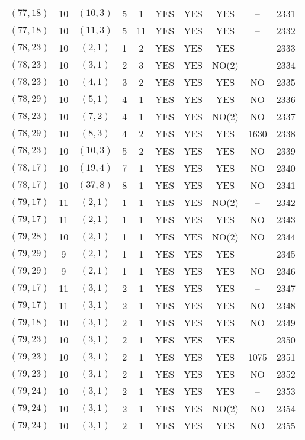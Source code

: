 \begin{longtable}{|c|c|c|c|c|c|c|c|c|c|}
$(77, 18)$ & 10 & $(10, 3)$ & 5 & 1 & YES & YES & YES & -- & 2331\\
$(77, 18)$ & 10 & $(11, 3)$ & 5 & 11 & YES & YES & YES & -- & 2332\\
$(78, 23)$ & 10 & $(2, 1)$ & 1 & 2 & YES & YES & YES & -- & 2333\\
$(78, 23)$ & 10 & $(3, 1)$ & 2 & 3 & YES & YES & NO(2) & -- & 2334\\
$(78, 23)$ & 10 & $(4, 1)$ & 3 & 2 & YES & YES & YES & NO & 2335\\
$(78, 29)$ & 10 & $(5, 1)$ & 4 & 1 & YES & YES & YES & NO & 2336\\
$(78, 23)$ & 10 & $(7, 2)$ & 4 & 1 & YES & YES & NO(2) & NO & 2337\\
$(78, 29)$ & 10 & $(8, 3)$ & 4 & 2 & YES & YES & YES & 1630 & 2338\\
$(78, 23)$ & 10 & $(10, 3)$ & 5 & 2 & YES & YES & YES & NO & 2339\\
$(78, 17)$ & 10 & $(19, 4)$ & 7 & 1 & YES & YES & YES & NO & 2340\\
$(78, 17)$ & 10 & $(37, 8)$ & 8 & 1 & YES & YES & YES & NO & 2341\\
$(79, 17)$ & 11 & $(2, 1)$ & 1 & 1 & YES & YES & NO(2) & -- & 2342\\
$(79, 17)$ & 11 & $(2, 1)$ & 1 & 1 & YES & YES & YES & NO & 2343\\
$(79, 28)$ & 10 & $(2, 1)$ & 1 & 1 & YES & YES & NO(2) & NO & 2344\\
$(79, 29)$ & 9 & $(2, 1)$ & 1 & 1 & YES & YES & YES & -- & 2345\\
$(79, 29)$ & 9 & $(2, 1)$ & 1 & 1 & YES & YES & YES & NO & 2346\\
$(79, 17)$ & 11 & $(3, 1)$ & 2 & 1 & YES & YES & YES & -- & 2347\\
$(79, 17)$ & 11 & $(3, 1)$ & 2 & 1 & YES & YES & YES & NO & 2348\\
$(79, 18)$ & 10 & $(3, 1)$ & 2 & 1 & YES & YES & YES & NO & 2349\\
$(79, 23)$ & 10 & $(3, 1)$ & 2 & 1 & YES & YES & YES & -- & 2350\\
$(79, 23)$ & 10 & $(3, 1)$ & 2 & 1 & YES & YES & YES & 1075 & 2351\\
$(79, 23)$ & 10 & $(3, 1)$ & 2 & 1 & YES & YES & YES & NO & 2352\\
$(79, 24)$ & 10 & $(3, 1)$ & 2 & 1 & YES & YES & YES & -- & 2353\\
$(79, 24)$ & 10 & $(3, 1)$ & 2 & 1 & YES & YES & NO(2) & NO & 2354\\
$(79, 24)$ & 10 & $(3, 1)$ & 2 & 1 & YES & YES & YES & NO & 2355\\

\end{longtable}
